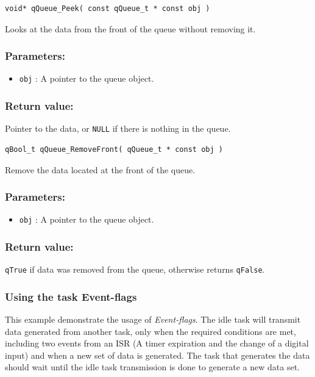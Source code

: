 \documentclass{article}
\begin{document}
\begin{lstlisting}[style=CStyle]
void* qQueue_Peek( const qQueue_t * const obj )
\end{lstlisting}

Looks at the data from the front of the queue without removing it.   

\subsubsection*{Parameters:}
\begin{itemize}
    \item \lstinline{obj} : A pointer to the queue object.
\end{itemize}

\subsubsection*{Return value:}
Pointer to the data, or \lstinline{NULL} if there is nothing in the queue.

\noindent\hrulefill


\begin{lstlisting}[style=CStyle]
qBool_t qQueue_RemoveFront( qQueue_t * const obj )
\end{lstlisting}

Remove the data located at the front of the queue. 

\subsubsection*{Parameters:}
\begin{itemize}
    \item \lstinline{obj} : A pointer to the queue object.
\end{itemize}

\subsubsection*{Return value:}
\lstinline{qTrue} if data was removed from the queue, otherwise returns \lstinline{qFalse}.

\subsubsection{Using the task Event-flags}
This example demonstrate the usage of \textit{Event-flags}. The idle task will transmit data generated from another task, only when the required conditions are met, including two events from an ISR (A timer expiration and the change of a digital input) and when a new set of data is generated.
The task that generates the data should wait until the idle task transmission is done to generate a new data set. \\
\end{document}
